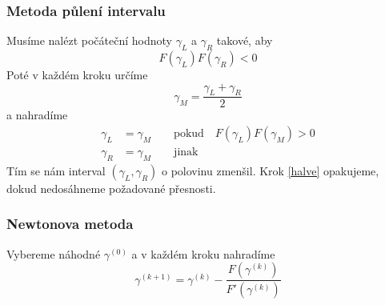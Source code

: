 \documentclass[a4paper]{article}
\begin{document}
\subsubsection*{Metoda půlení intervalu}
Musíme nalézt počáteční hodnoty \( \gamma_L \) a \( \gamma_R \) takové, aby
\begin{equation}
	F \left( \gamma_L \right) F \left( \gamma_R \right) < 0
\end{equation}
Poté v každém kroku určíme
\begin{equation}
	\gamma_M = \frac{\gamma_L + \gamma_R}{2}
\end{equation}
a nahradíme
\begin{subequations}\label{halve}
	\begin{align}
		\gamma_L &= \gamma_M \qquad \text{pokud} \quad F \left( \gamma_L \right) F \left( \gamma_M \right) > 0 \\
		\gamma_R &= \gamma_M \qquad \text{jinak}
	\end{align}
\end{subequations}
Tím se nám interval \( \left( \gamma_L, \gamma_R \right) \) o polovinu zmenšil. Krok \eqref{halve} opakujeme, dokud nedosáhneme požadované přesnosti.

\subsubsection*{Newtonova metoda}
Vybereme náhodné \( \gamma^{ \left( 0 \right)} \) a v každém kroku nahradíme
\begin{equation}
	\gamma^{ \left( k + 1 \right) } = \gamma^{ \left( k \right) } - \frac{F \left( \gamma^{ \left( k \right) } \right) }{F' \left( \gamma^{ \left( k \right) } \right) }
\end{equation}
\end{document}

